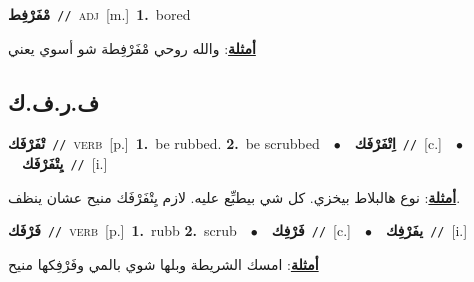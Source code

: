 \documentclass[10pt,a4paper,twoside]{article} %
\begin{document}
\begin{multicols}{2}
{\setlength\topsep{0pt}\textbf{\foreignlanguage{arabic}{مْفَرْفِط}}\ {\color{gray}\texttt{//}\color{black}}\ \textsc{adj}\ [m.]\ \textbf{1.}~bored\  \begin{flushright}\color{gray}\foreignlanguage{arabic}{\textbf{\underline{\foreignlanguage{arabic}{أمثلة}}}: والله روحي مْفَرْفِطة شو أسوي يعني}\end{flushright}\color{black}} \vspace{2mm}

\vspace{-3mm}
\subsection*{\color{blue}\foreignlanguage{arabic}{ف.ر.ف.ك}\color{blue}{}} 

{\setlength\topsep{0pt}\textbf{\foreignlanguage{arabic}{تْفَرْفَك}}\ {\color{gray}\texttt{//}\color{black}}\ \textsc{verb}\ [p.]\ \textbf{1.}~be rubbed.  \textbf{2.}~be scrubbed\ \ $\bullet$\ \ \setlength\topsep{0pt}\textbf{\foreignlanguage{arabic}{اِتْفَرْفَك}}\ {\color{gray}\texttt{//}\color{black}}\ [c.]\ \ $\bullet$\ \ \setlength\topsep{0pt}\textbf{\foreignlanguage{arabic}{يِتْفَرْفَك}}\ {\color{gray}\texttt{//}\color{black}}\ [i.]\  \begin{flushright}\color{gray}\foreignlanguage{arabic}{\textbf{\underline{\foreignlanguage{arabic}{أمثلة}}}: نوع هالبلاط بيخزي. كل شي بيطبِّع عليه. لازم يِتْفَرْفَك منيح عشان ينظف.}\end{flushright}\color{black}} \vspace{2mm}

{\setlength\topsep{0pt}\textbf{\foreignlanguage{arabic}{فَرْفَك}}\ {\color{gray}\texttt{//}\color{black}}\ \textsc{verb}\ [p.]\ \textbf{1.}~rubb  \textbf{2.}~scrub\ \ $\bullet$\ \ \setlength\topsep{0pt}\textbf{\foreignlanguage{arabic}{فَرْفِك}}\ {\color{gray}\texttt{//}\color{black}}\ [c.]\ \ $\bullet$\ \ \setlength\topsep{0pt}\textbf{\foreignlanguage{arabic}{يفَرْفِك}}\ {\color{gray}\texttt{//}\color{black}}\ [i.]\  \begin{flushright}\color{gray}\foreignlanguage{arabic}{\textbf{\underline{\foreignlanguage{arabic}{أمثلة}}}: امسك الشريطة وبلها شوي بالمي وفَرْفِكها منيح}\end{flushright}\color{black}} \vspace{2mm}


\end{multicols}
\end{document}
